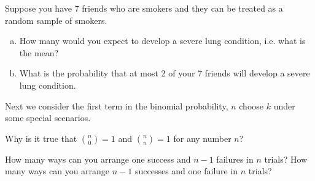 \begin{exercisewrap}
\begin{nexercise}
Suppose you have 7 friends who are smokers and they can
be treated as a random sample of smokers.\footnotemark{}
\begin{enumerate}[(a)]
\setlength{\itemsep}{0mm}
\item
    How many would you expect to develop a severe lung
    condition, i.e. what is the mean?
\item
    What is the probability that at most 2 of your 7
    friends will develop a severe lung condition.
\end{enumerate}
\end{nexercise}
\end{exercisewrap}

Next we consider the first term in the binomial probability,
$n$ choose $k$ under some special scenarios.

\begin{exercisewrap}
\begin{nexercise}
Why is it true that ${n \choose 0}=1$ and ${n \choose n}=1$
for any number $n$?\footnotemark{}
\end{nexercise}
\end{exercisewrap}

\begin{exercisewrap}
\begin{nexercise}
How many ways can you arrange one success and $n-1$ failures
in $n$ trials?
How many ways can you arrange $n-1$ successes and one failure
in $n$ trials?\footnotemark{}
\end{nexercise}
\end{exercisewrap}


